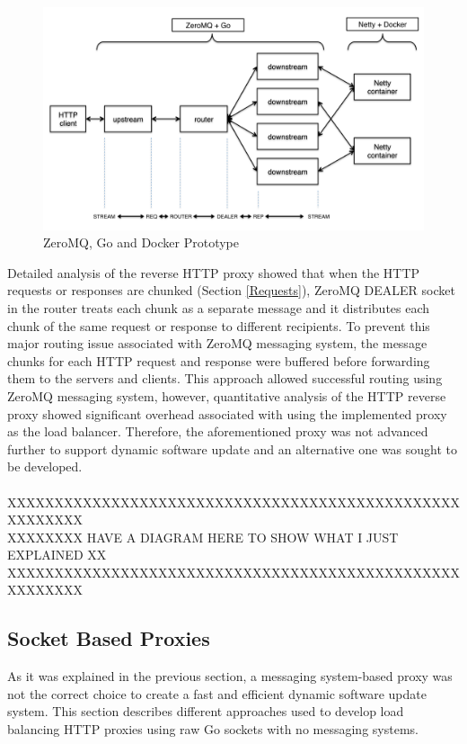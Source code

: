 \documentclass[a4paper,11pt,twoside]{article}
\begin{document}
\begin{figure}[!ht]
  \centering
     \includegraphics[scale=0.62]{prototype}
  \caption{ZeroMQ, Go and Docker Prototype}
  \label{prototype}
\end{figure}

\noindent
Detailed analysis of the reverse HTTP proxy showed that when the HTTP requests or responses are chunked (Section \ref{Requests}), ZeroMQ DEALER socket in the router treats each chunk as a separate message and it distributes each chunk of the same request or response to different recipients. To prevent this major routing issue associated with ZeroMQ messaging system, the message chunks for each HTTP request and response were buffered before forwarding them to the servers and clients. This approach allowed successful routing using ZeroMQ messaging system, however, quantitative analysis of the HTTP reverse proxy showed significant overhead associated with using the implemented proxy as the load balancer. Therefore, the aforementioned proxy was not advanced further to support dynamic software update and an alternative one was sought to be developed. \\\\
XXXXXXXXXXXXXXXXXXXXXXXXXXXXXXXXXXXXXXXXXXXXXXXXXXXXXXXX\\
XXXXXXXX HAVE A DIAGRAM HERE TO SHOW WHAT I JUST EXPLAINED XX\\
XXXXXXXXXXXXXXXXXXXXXXXXXXXXXXXXXXXXXXXXXXXXXXXXXXXXXXXX\\


\subsection{Socket Based Proxies}
As it was explained in the previous section, a messaging system-based proxy was not the correct choice to create a fast and efficient dynamic software update system. This section describes different approaches used to develop load balancing HTTP proxies using raw Go sockets with no messaging systems.   
\end{document}
